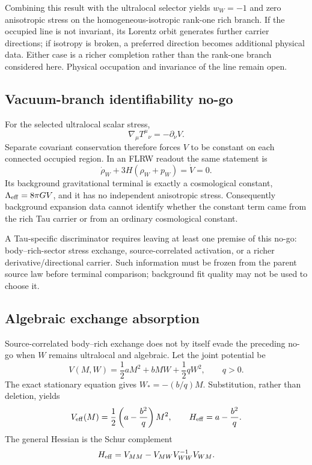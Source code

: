 \documentclass[11pt]{article}
\begin{document}
Combining this result with the ultralocal selector yields \(w_W=-1\) and zero
anisotropic stress on the homogeneous-isotropic rank-one rich branch. If the
occupied line is not invariant, its Lorentz orbit generates further carrier
directions; if isotropy is broken, a preferred direction becomes additional
physical data. Either case is a richer completion rather than the rank-one
branch considered here. Physical occupation and invariance of the line remain
open.

\subsection{Vacuum-branch identifiability no-go}

For the selected ultralocal scalar stress,
\begin{equation}
 \nabla_\mu T^{\mu}{}_{\nu}=-\partial_\nu V.
 \label{eq:vacuum-divergence}
\end{equation}
Separate covariant conservation therefore forces \(V\) to be constant on each
connected occupied region. In an FLRW readout the same statement is
\begin{equation}
 \dot\rho_W+3H(\rho_W+p_W)=\dot V=0.
 \label{eq:vacuum-continuity}
\end{equation}
Its background gravitational terminal is exactly a cosmological constant,
\(\Lambda_{\rm eff}=8\pi G V\), and it has no independent anisotropic stress.
Consequently background expansion data cannot identify whether the constant
term came from the rich Tau carrier or from an ordinary cosmological constant.

A Tau-specific discriminator requires leaving at least one premise of this
no-go: body--rich-sector stress exchange, source-correlated activation, or a
richer derivative/directional carrier. Such information must be frozen from
the parent source law before terminal comparison; background fit quality may
not be used to choose it.

\subsection{Algebraic exchange absorption}

Source-correlated body--rich exchange does not by itself evade the preceding
no-go when \(W\) remains ultralocal and algebraic. Let the joint potential be
\begin{equation}
 V(M,W)=\frac12 aM^2+bMW+\frac12 qW^2,\qquad q>0.
 \label{eq:algebraic-exchange-potential}
\end{equation}
The exact stationary equation gives \(W_*=-(b/q)M\). Substitution, rather than
deletion, yields
\begin{equation}
 V_{\rm eff}(M)=\frac12\left(a-\frac{b^2}{q}\right)M^2,
 \qquad
 H_{\rm eff}=a-\frac{b^2}{q}.
 \label{eq:algebraic-exchange-schur}
\end{equation}
The general Hessian is the Schur complement
\begin{equation}
 H_{\rm eff}=V_{MM}-V_{MW}V_{WW}^{-1}V_{WM}.
 \label{eq:general-exchange-schur}
\end{equation}
\end{document}
